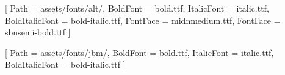 \newfontfamily{}[
    Path = assets/fonts/alt/,
    BoldFont = bold.ttf,
    ItalicFont = italic.ttf,
    BoldItalicFont = bold-italic.ttf,
    FontFace = {mid}{n}{medium.ttf},
    FontFace = {sb}{n}{semi-bold.ttf}
]

\newfontfamily{}[
    Path = assets/fonts/jbm/,
    BoldFont = bold.ttf,
    ItalicFont = italic.ttf,
    BoldItalicFont = bold-italic.ttf
]

